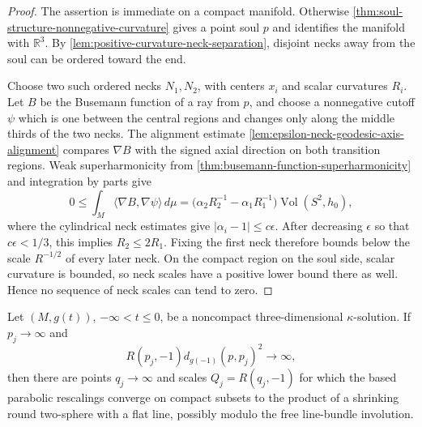 \begin{proof}
The assertion is immediate on a compact manifold.  Otherwise
\ref{thm:soul-structure-nonnegative-curvature} gives a point soul $p$ and
identifies the manifold with $\mathbb R^3$.  By
\ref{lem:positive-curvature-neck-separation}, disjoint necks away from the
soul can be ordered toward the end.

Choose two such ordered necks $N_1,N_2$, with centers $x_i$ and scalar
curvatures $R_i$.  Let $B$ be the Busemann function of a ray from $p$, and
choose a nonnegative cutoff $\psi$ which is one between the central regions
and changes only along the middle thirds of the two necks.  The alignment
estimate \ref{lem:epsilon-neck-geodesic-axis-alignment} compares $\nabla B$
with the signed axial direction on both transition regions.  Weak
superharmonicity from \ref{thm:busemann-function-superharmonicity} and
integration by parts give
\[
 0\le \int_M\langle\nabla B,\nabla\psi\rangle\,d\mu
   =\bigl(\alpha_2R_2^{-1}-\alpha_1R_1^{-1}\bigr)
      \operatorname{Vol}(S^2,h_0),
\]
where the cylindrical neck estimates give
$|\alpha_i-1|\le c\epsilon$.  After decreasing $\epsilon$ so that
$c\epsilon<1/3$, this implies $R_2\le2R_1$.  Fixing the first neck therefore
bounds below the scale $R^{-1/2}$ of every later neck.  On the compact region
on the soul side, scalar curvature is bounded, so neck scales have a positive
lower bound there as well.  Hence no sequence of neck scales can tend to
zero.
\end{proof}

\begin{theorem}
\label{thm:kappa-solution-splitting-at-infinity}
\notready
Let $(M,g(t))$, $-\infty<t\le0$, be a noncompact three-dimensional
$\kappa$-solution.  If $p_j\to\infty$ and
\[
 R(p_j,-1)d_{g(-1)}(p,p_j)^2\longrightarrow\infty,
\]
then there are points $q_j\to\infty$ and scales $Q_j=R(q_j,-1)$ for
which the based parabolic rescalings converge on compact subsets to the
product of a shrinking round two-sphere with a flat line, possibly modulo
the free line-bundle involution.
\end{theorem}

